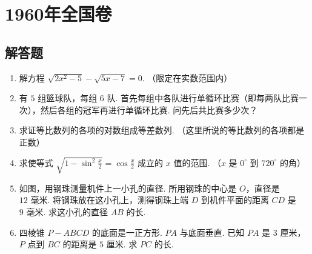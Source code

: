 \chapter{1960年全国卷}

\section{解答题}

\begin{problem}
\begin{enumerate}
\item
解方程 \(\sqrt{2x^{2}-5}-\sqrt{5x-7}=0\). （限定在实数范围内）

\item
有 \(5\) 组篮球队，每组 \(6\) 队. 首先每组中各队进行单循环比赛（即每两队比赛一次），然后各组的冠军再进行单循环比赛. 问先后共比赛多少次？

\item
求证等比数列的各项的对数组成等差数列. （这里所说的等比数列的各项都是正数）

\item
求使等式 \(\sqrt{1-\sin^{2}\frac{x}{2}}=\cos\frac{x}{2}\) 成立的 \(x\) 值的范围. （\(x\) 是 \(0^{\circ}\) 到 \(720^{\circ}\) 的角）

\item
如图，用钢珠测量机件上一小孔的直径. 所用钢珠的中心是 \(O\)，直径是 \(12\text{ 毫米}\). 将钢珠放在这小孔上，测得钢珠上端 \(D\) 到机件平面的距离 \(CD\) 是 \(9\text{ 毫米}\). 求这小孔的直径 \(AB\) 的长.

\item
四棱锥 \(P-ABCD\) 的底面是一正方形. \(PA\) 与底面垂直. 已知 \(PA\) 是 \(3\text{ 厘米}\)，\(P\) 点到 \(BC\) 的距离是 \(5\text{ 厘米}\). 求 \(PC\) 的长.
\end{enumerate}

\begingroup
\def\theprobnum{5}%
\endgroup
\end{problem}

